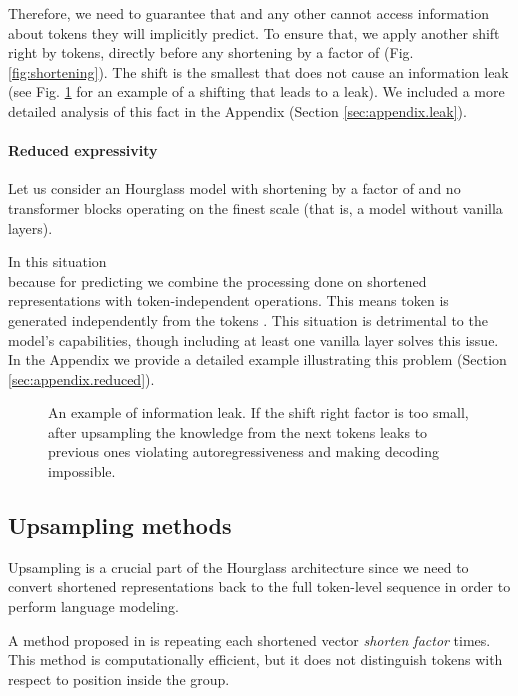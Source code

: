 \documentclass[11pt]{article}
\begin{document}
Therefore, we need to guarantee that  and any other  cannot access information about tokens they will implicitly predict. To ensure that, we apply another shift right by  tokens, directly before any shortening by a factor of  (Fig. \ref{fig:shortening}). The shift is the smallest that does not cause an information leak (see Fig. \ref{fig:leak} for an example of a shifting that leads to a leak). We included a more detailed analysis of this fact in the Appendix (Section \ref{sec:appendix.leak}).


\paragraph{Reduced expressivity}
Let us consider an Hourglass model with shortening by a factor of  and no transformer blocks operating on the finest scale (that is, a model without vanilla layers). 

In this situation\\ 


because for predicting  we combine the processing done on shortened representations  with token-independent operations. This  means token  is generated independently from the tokens . This situation is detrimental to the model's capabilities, though including at least one vanilla layer solves this issue. In the Appendix we provide a detailed example illustrating this problem (Section \ref{sec:appendix.reduced}). 

\begin{figure}[ht]
\centering
\centering
\caption{An example of information leak. If the shift right factor is too small, after upsampling the knowledge from the next tokens leaks to previous ones violating autoregressiveness and making decoding impossible. }
\label{fig:leak}
\end{figure}

\subsection{Upsampling methods}\label{sec:upsampling-methods}
Upsampling is a crucial part of the Hourglass architecture since we need to convert shortened representations back to the full token-level sequence in order to perform language modeling. 


A method proposed in \cite{dai2020funneltransformer} is repeating each shortened vector \emph{shorten factor} times. This method is computationally efficient, but it does not distinguish tokens with respect to position inside the group. 
\end{document}
